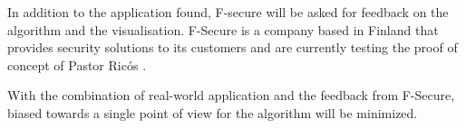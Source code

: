 In addition to the application found, F-secure will be asked for feedback on the algorithm and the visualisation. F-Secure is a company based in Finland that provides security solutions to its customers and are currently testing the proof of concept of Pastor Ricós \cite{f-secure}.

With the combination of real-world application and the feedback from F-Secure, biased towards a single point of view for the algorithm will be minimized. 